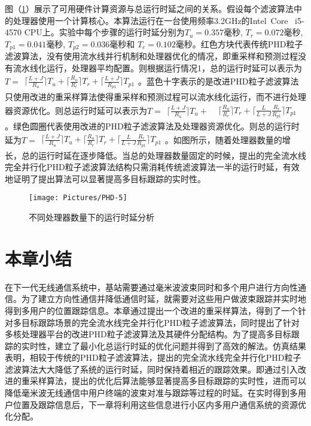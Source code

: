 图（\ref{fig:08}）展示了可用硬件计算资源与总运行时延之间的关系。假设每个滤波算法中的处理器使用一个计算核心。本算法运行在一台使用频率3.2GHz的Intel\textregistered  ~Core\texttrademark ~ i5-4570 CPU上。实验中每个步骤的运行时延分别为$T_{u}=0.357$毫秒, $T_{r}=0.072$毫秒, $T_{p1}=0.041$毫秒, $T_{p2}=0.036$毫秒和 $T_{c}=0.102$毫秒。红色方块代表传统PHD粒子滤波算法，没有使用流水线并行机制和处理器优化的情况，即重采样和预测过程没有流水线化运行，处理器平均配置。则根据运行情况1，总的运行时延可以表示为$T=\begin{aligned}\lceil\frac{L+J}{R_{u}}\rceil T_{u}+\lceil\frac{R_{u}}{R_{r}}\rceil T_{r}+\lceil\frac{L+J}{R_{p1}}\rceil T_{p1}\end{aligned}$。蓝色十字表示的是改进PHD粒子滤波算法只使用改进的重采样算法使得重采样和预测过程可以流水线化运行，而不进行处理器资源优化。则总运行时延可以表示为$T=\begin{aligned}\lceil\frac{L+J}{R_{u}}\rceil T_{u} + \end{aligned} $ $\begin{aligned}   \lceil\frac{R_{u}}{R_{r}}\rceil T_{r}+\lceil\frac{L}{L+J}\frac{R_r}{R_{p1}}\rceil T_{p1}\end{aligned}$。绿色圆圈代表使用改进的PHD粒子滤波算法及处理器资源优化。则总的运行时延为$T=\begin{aligned}\lceil\frac{L+J} {R_{u}}\rceil T_{u}+\lceil\frac{R_{u}}{R_{r}}\rceil T_{r}+\lceil\frac{L}{L+J}\frac{R_r}{R_{p1}}\rceil T_{p1}\end{aligned}$。如图所示，随着处理器数量的增长，总的运行时延在逐步降低。当总的处理器数量固定的时候，提出的完全流水线完全并行化PHD粒子滤波算法结构只需消耗传统滤波算法一半的运行时延，有效地证明了提出算法可以显著提高多目标跟踪的实时性。

\begin{figure}[htbp]
\centering
\texttt{[image: Pictures/PHD-5]}
\caption{不同处理器数量下的运行时延分析}
\label{fig:08}
\end{figure}

\section{本章小结}

在下一代无线通信系统中，基站需要通过毫米波波束同时和多个用户进行方向性通信。为了建立方向性通信并降低通信时延，就需要对这些用户做波束跟踪并实时地得到多用户的位置跟踪信息。本章通过提出一个改进的重采样算法，得到了一个针对多目标跟踪场景的完全流水线完全并行化PHD粒子滤波算法，同时提出了针对多核处理器平台的改进PHD粒子滤波算法及其硬件分配结构。为了提高多目标跟踪的实时性，建立了最小化总运行时延的优化问题并得到了高效的解法。仿真结果表明，相较于传统的PHD粒子滤波算法，提出的完全流水线完全并行化PHD粒子滤波算法大大降低了系统的运行时延，同时保持着相近的跟踪效果。即通过引入改进的重采样算法，提出的优化后算法能够显著提高多目标跟踪的实时性，进而可以降低毫米波无线通信中用户终端的波束对准与跟踪等过程的时延。在实时得到多用户位置及跟踪信息后，下一章将利用这些信息进行小区内多用户通信系统的资源优化分配。
